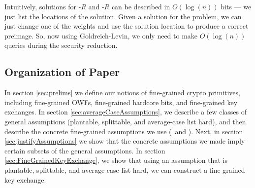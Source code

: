 Intuitively, solutions for \kSum-$R$ and \zkclique-$R$ can be described in $O(\log(n))$ bits --- we just list the locations of the solution. Given a solution for the problem, we can just change one of the weights and use the solution location to produce a correct preimage. So, now using Goldreich-Levin, we only need to make $O(\log(n))$ queries during the security reduction.






%



\subsection{Organization of Paper}

In section \ref{sec:prelims} we define our notions of fine-grained crypto primitives, including fine-grained OWFs, fine-grained hardcore bits, and  fine-grained key exchanges. In section \ref{sec:averageCaseAssumptions}, we describe a few classes of general assumptions (plantable, splittable, and average-case list hard), and then describe the concrete fine-grained assumptions we use (\kSum~and \zkclique). Next, in section \ref{sec:justifyAssumptions} we show that the concrete assumptions we made imply certain subsets of the general assumptions. 
In section \ref{sec:FineGrainedKeyExchange}, we show that using an assumption that is plantable, splittable, and average-case list hard, we can construct a fine-grained key exchange.

